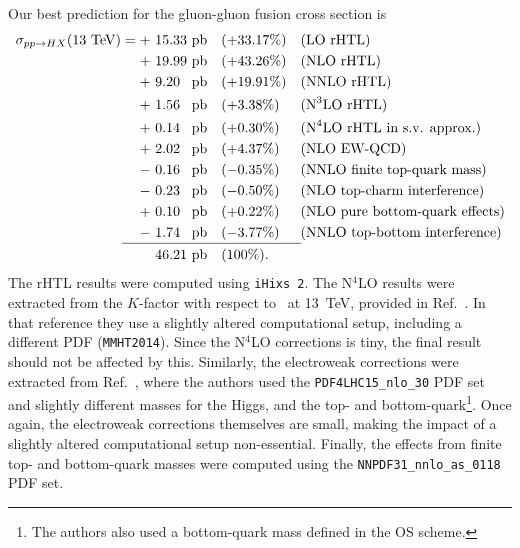 Our best prediction for the gluon-gluon fusion cross section is
\begin{equation}
\begin{alignedat}{4}
\sigma_{pp \rightarrow HX} (13\ \mathrm{TeV}) = +\ & 15.33 \ &&\mathrm{pb    } && (+33.17\%) \quad  &&(\text{LO rHTL}) \\
+\ & 19.99\ &&\mathrm{pb} \quad && (+43.26\%)  &&(\text{NLO rHTL}) \\
+\ & 9.20\ &&\mathrm{pb} \quad && (+19.91\%) &&(\text{NNLO rHTL}) \\
+\ & 1.56\ &&\mathrm{pb} \quad && (+3.38\%) &&(\text{N}^3\text{LO rHTL}) \\
+\ & 0.14\ &&\mathrm{pb} \quad && (+0.30\%) &&(\text{N}^4 \text{LO rHTL in s.v. approx.}) \\
+\ & 2.02\ &&\mathrm{pb} \quad && (+4.37\%) &&(\text{NLO EW-QCD}) \\
-\ & 0.16\ &&\mathrm{pb} \quad && (-0.35\%) &&(\text{NNLO finite top-quark mass}) \\
-\ & 0.23\ &&\mathrm{pb} \quad && (-0.50\%) &&(\text{NLO top-charm interference}) \\
+\ & 0.10 \ &&\mathrm{pb}\quad && (+0.22\%) &&(\text{NLO pure bottom-quark effects}) \\
-\ & 1.74\ &&\mathrm{pb} \quad && (-3.77\%) &&(\text{NNLO top-bottom interference}) \\[-10pt]
& &&  \hspace{0.5cm} \mathclap{\rule{4.5cm}{0.4pt}}\\[-4pt]
& 46.21 \ &&\mathrm{pb} && (100\%).
\end{alignedat}
\end{equation}
The \acs{rHTL} results were computed using \texttt{iHixs 2}. The N${}^4$LO results were extracted from the $K$-factor with respect to \NNNLO\ at 13~TeV, provided in Ref.~\cite{Das:2020adl}. In that reference they use a slightly altered computational setup, including a different \acs{PDF} (\texttt{MMHT2014}). Since the N${}^4$LO corrections is tiny, the final result should not be affected by this. Similarly, the electroweak corrections were extracted from Ref.~\cite{Becchetti:2020wof}, where the authors used the \texttt{PDF4LHC15\_nlo\_30} PDF set and slightly different masses for the Higgs, and the top- and bottom-quark\footnote{The authors also used a bottom-quark mass defined in the \acs{OS} scheme.}. Once again, the electroweak corrections themselves are small, making the impact of a slightly altered computational setup non-essential. Finally, the effects from finite top- and bottom-quark masses were computed using the \texttt{NNPDF31\_nnlo\_as\_0118} PDF set.

